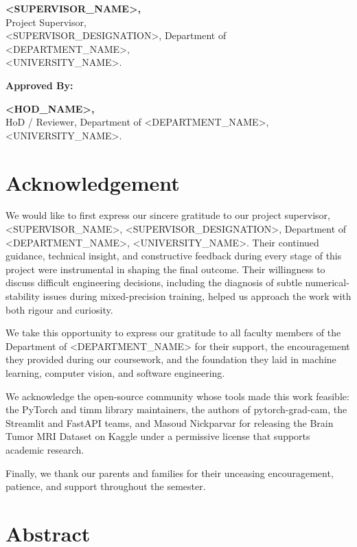 \documentclass[12pt,a4paper,oneside]{report}
\begin{document}
\vspace{1.5cm}
\noindent
\textbf{<SUPERVISOR\_NAME>,} \\
Project Supervisor, \\
<SUPERVISOR\_DESIGNATION>, Department of <DEPARTMENT\_NAME>, \\
<UNIVERSITY\_NAME>.

\vspace{1.0cm}
\textbf{Approved By:}

\vspace{1.0cm}
\noindent
\textbf{<HOD\_NAME>,} \\
HoD / Reviewer, Department of <DEPARTMENT\_NAME>, \\
<UNIVERSITY\_NAME>.

\chapter*{Acknowledgement}

We would like to first express our sincere gratitude to our project
supervisor, <SUPERVISOR\_NAME>, <SUPERVISOR\_DESIGNATION>, Department of
<DEPARTMENT\_NAME>, <UNIVERSITY\_NAME>. Their continued guidance,
technical insight, and constructive feedback during every stage of this
project were instrumental in shaping the final outcome. Their willingness
to discuss difficult engineering decisions, including the diagnosis of
subtle numerical-stability issues during mixed-precision training, helped
us approach the work with both rigour and curiosity.

We take this opportunity to express our gratitude to all faculty members
of the Department of <DEPARTMENT\_NAME> for their support, the
encouragement they provided during our coursework, and the foundation
they laid in machine learning, computer vision, and software engineering.

We acknowledge the open-source community whose tools made this work
feasible: the PyTorch and timm library maintainers, the authors of
pytorch-grad-cam, the Streamlit and FastAPI teams, and Masoud Nickparvar
for releasing the Brain Tumor MRI Dataset on Kaggle under a permissive
license that supports academic research.

Finally, we thank our parents and families for their unceasing
encouragement, patience, and support throughout the semester.

\chapter*{Abstract}
\end{document}
